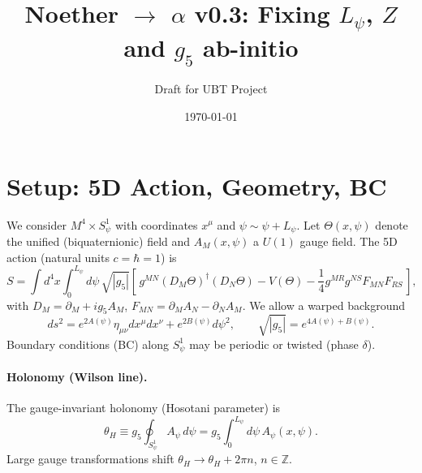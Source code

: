 \documentclass[12pt]{article}
\title{Noether $\to$ $\alpha$ v0.3: Fixing $L_\psi$, $Z$ and $g_5$ ab-initio}
\author{Draft for UBT Project}
\date{\today}
\begin{document}
\maketitle

\section{Setup: 5D Action, Geometry, BC}
We consider $M^4 \times S^1_\psi$ with coordinates $x^\mu$ and $\psi \sim \psi+L_\psi$.
Let $\Theta(x,\psi)$ denote the unified (biquaternionic) field and $A_M(x,\psi)$ a $U(1)$ gauge field.
The 5D action (natural units $c=\hbar=1$) is
\begin{equation}
S = \int d^4x \int_0^{L_\psi} d\psi\, \sqrt{|g_5|}\left[
\, g^{MN} (D_M\Theta)^\dagger (D_N\Theta)
 - V(\Theta) - \frac{1}{4} g^{MR} g^{NS} F_{MN}F_{RS}\,\right],
\label{eq:5Daction}
\end{equation}
with $D_M=\partial_M + i g_5 A_M$, $F_{MN}=\partial_M A_N-\partial_N A_M$.
We allow a warped background
\begin{equation}
ds^2 = e^{2A(\psi)} \eta_{\mu\nu}dx^\mu dx^\nu + e^{2B(\psi)} d\psi^2,
\qquad \sqrt{|g_5|}=e^{4A(\psi)+B(\psi)}.
\end{equation}
Boundary conditions (BC) along $S^1_\psi$ may be periodic or twisted (phase $\delta$).

\paragraph{Holonomy (Wilson line).}
The gauge-invariant holonomy (Hosotani parameter) is
\begin{equation}
\theta_H \equiv g_5 \oint_{S^1_\psi} \! A_\psi \, d\psi = g_5 \int_0^{L_\psi} d\psi\, A_\psi(x,\psi).
\label{eq:thetaH}
\end{equation}
Large gauge transformations shift $\theta_H \to \theta_H + 2\pi n$, $n\in\mathbb{Z}$.
\end{document}
